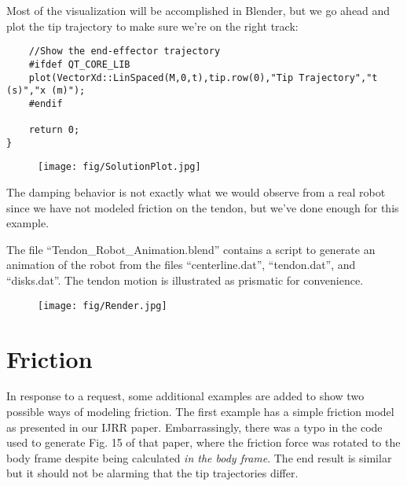 \documentclass[12pt]{article}
\begin{document}
Most of the visualization will be accomplished in Blender, but we go ahead and plot the tip trajectory to make sure we're on the right track:
\begin{lstlisting}
    //Show the end-effector trajectory
    #ifdef QT_CORE_LIB
    plot(VectorXd::LinSpaced(M,0,t),tip.row(0),"Tip Trajectory","t (s)","x (m)");
    #endif

    return 0;
}
\end{lstlisting}

\begin{figure}[h]
	\centering
		\texttt{[image: fig/SolutionPlot.jpg]}
	\label{fig:Plot}
\end{figure}
The damping behavior is not exactly what we would observe from a real robot since we have not modeled friction on the tendon, but we've done enough for this example.

The file ``Tendon\_Robot\_Animation.blend'' contains a script to generate an animation of the robot from the files ``centerline.dat'', ``tendon.dat'', and ``disks.dat''. The tendon motion is illustrated as prismatic for convenience.

\begin{figure}[h]
	\centering
		\texttt{[image: fig/Render.jpg]}
	\label{fig:Render}
\end{figure}

\newpage

\section*{Friction}

In response to a request, some additional examples are added to show two possible ways of modeling friction. The first example has a simple friction model as presented in our IJRR paper. Embarrassingly, there was a typo in the code used to generate Fig. 15 of that paper, where the friction force was rotated to the body frame despite being calculated \emph{in the body frame}. The end result is similar but it should not be alarming that the tip trajectories differ.
\end{document}
